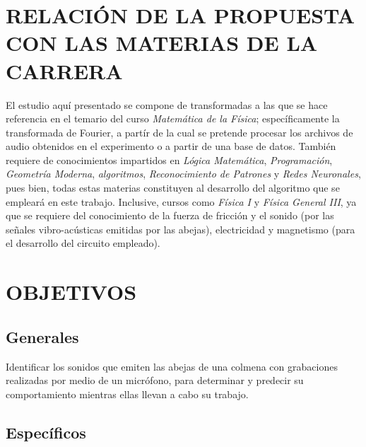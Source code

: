 \documentclass[12pt]{report}
\begin{document}
	
	
	\chapter{RELACIÓN DE LA PROPUESTA CON LAS MATERIAS DE LA CARRERA}
	
	El estudio aquí presentado se compone de transformadas a las que se hace referencia en el temario del curso \textit{Matemática de la Física}; específicamente la transformada de Fourier, a partír de la cual se pretende procesar los archivos de audio obtenidos en el experimento o a partir de una base de datos. También requiere de conocimientos impartidos en \textit{Lógica Matemática}, \textit{Programación}, \textit{Geometría Moderna}, \textit{algoritmos}, \textit{Reconocimiento de Patrones} y \textit{Redes Neuronales}, pues bien, todas estas materias constituyen al desarrollo del algoritmo que se empleará en este trabajo. Inclusive, cursos como \textit{Física I} y \textit{Física General III}, ya que se requiere del conocimiento de la fuerza de fricción y el sonido (por las señales vibro-acústicas emitidas por las abejas), electricidad y magnetismo (para el desarrollo del circuito empleado).
	
	
	\chapter{OBJETIVOS}
	
	\section{Generales}
	
	Identificar los sonidos que emiten las abejas de una colmena con grabaciones realizadas por medio de un micrófono, para determinar y predecir su comportamiento mientras ellas llevan a cabo su trabajo.
	
	\section{Específicos}
	
\end{document}

